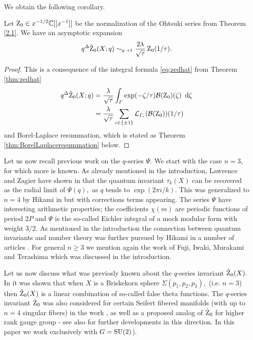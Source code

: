   We obtain the following corollary.
  \begin{corollary}
  	Let $\operatorname{Z}_0 \in x^{-1/2}\mathbb{C}[[x^{-1}]]$ be the normalization of the Ohtsuki series from Theorem \ref{2.1}. We have an asymptotic expansion
  	\begin{equation}
  	q^{\Delta} \hat{\operatorname{Z}}_0(X;q) \sim_{q\rightarrow 1} \frac{2\lambda}{\sqrt{\tau}} \operatorname{Z}_0(1/\tau).
  	\end{equation}
  \end{corollary}



\begin{proof}
	This is a consequence of the integral formula \eqref{eq:zedhat} from Theorem \ref{thm:zedhat}
	\begin{align} q^{\Delta}\hat{\operatorname{Z}}_0(X;q)&= \frac{\lambda}{\sqrt{\tau}} \int_{\varGamma} \exp(-\zeta / \tau )  \mathcal{B}(\operatorname{Z}_0) (\zeta) \ \operatorname{{d}\hskip-.6mm} \zeta
	\\ &= \frac{\lambda}{\sqrt{\tau}} \sum_{\epsilon\in \{\pm1\}} \mathcal{L}_{\varGamma_{\epsilon}} (\mathcal{B}(\operatorname{Z}_0))(1/\tau)
	\end{align}
	and Borel-Laplace resummation, which is stated as Theorem \ref{thm:BorelLaplaceresummation} below.  
	\end{proof}
  
  
  Let us now recall previous work on the $q$-series $\Psi.$ We start with the case  $n=3,$ for which more is known. As already mentioned in the introduction, Lawrence and Zagier have shown in \cite{LawrenceZagier} that the quantum invariant $\tau_k(X)$ can be recovered as the radial limit of $\Psi(q),$ as $q$ tends to $\exp(2\pi i/k)$.
   This was generalized to $n=4$ by Hikami in \cite{Hikami05b} but with corrections terms appearing.  The series $\Psi$ have interesting arithmetic properties; the coefficients $\chi(m)$ are periodic functions of period $2P$ and $\Psi$ is the so-called Eichler integral of a mock modular form with weight $3/2.$ As mentioned in the introduction the connection between quantum invariants and number theory was further pursued by Hikami in a number of articles \cite{Hikami05c, Hikami2004,  Hikami05b,Hikami06q, Hikami11}. For general $n\geq 3$ we mention again the work \cite{Hiroyuki} of Fuji, Iwaki, Murakami and Terashima which was discussed in the introduction.
  
  
  Let us now discuss what was previosly known about the $q$-series invariant $\hat{\operatorname{Z}}_0(X).$ In \cite{GukovCiprian19} it was shown that when $X$ is a Briskekorn sphere $\Sigma(p_1,p_2,p_3),$ (i.e. $n=3$) then  $\hat{\operatorname{Z}}_0(X)$ is a linear combination of so-called false theta functions.  The $q$-series invariant $\hat{\operatorname{Z}}_0$ was also considered for certain Seifert fibered manifolds (with up to $n=4$ singular fibers) in the work \cite{ChungHJ18}, as well as a proposed analog of $\hat{\operatorname{Z}}_0$ for higher rank gauge group - see also \cite{2019arXiv190913002P} for further developments in this direction. In this paper we work exclusively with $G=\operatorname{SU}(2)$).
  
